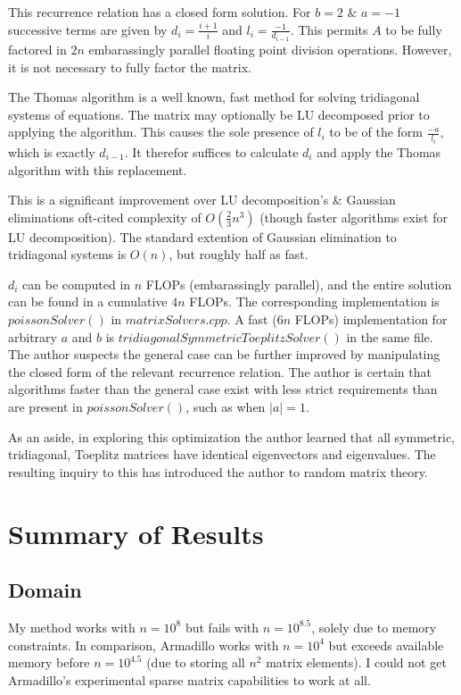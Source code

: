 \documentclass[10pt, conference, compsocconf]{IEEEtran}
\begin{document}
This recurrence relation has a closed form solution. For $b=2$ \& $a=-1$ successive terms are given by $d_i = \frac{i+1}{i}$ and $l_i = \frac{-1}{d_{i-1}}$. This permits $A$ to be fully factored in $2n$ embarassingly parallel floating point division operations. However, it is not necessary to fully factor the matrix.

The Thomas algorithm is a well known, fast method for solving tridiagonal systems of equations. The matrix may optionally be LU decomposed prior to applying the algorithm. This causes the sole presence of $l_i$ to be of the form $\frac{-a}{l_i}$, which is exactly $d_{i-1}$. It therefor suffices to calculate $d_i$ and apply the Thomas algorithm with this replacement. 

This is a significant improvement over LU decomposition's \& Gaussian eliminations oft-cited complexity of $O\left(\frac{2}{3}n^3\right)$ (though faster algorithms exist for LU decomposition). The standard extention of Gaussian elimination to tridiagonal systems is $O(n)$, but roughly half as fast.

$d_i$ can be computed in $n$ FLOPs (embarassingly parallel), and the entire solution can be found in a cumulative $4n$ FLOPs. The corresponding implementation is $poissonSolver()$ in $matrixSolvers.cpp$. A fast ($6n$ FLOPs) implementation for arbitrary $a$ and $b$ is $tridiagonalSymmetricToeplitzSolver()$ in the same file. The author suspects the general case can be further improved by manipulating the closed form of the relevant recurrence relation. The author is certain that algorithms faster than the general case exist with less strict requirements than are present in $poissonSolver()$, such as when $|a|=1$. 

As an aside, in exploring this optimization the author learned that all symmetric, tridiagonal, Toeplitz matrices have identical eigenvectors and eigenvalues. The resulting inquiry to this has introduced the author to random matrix theory.

\section{Summary of Results}
\subsection{Domain}
My method works with $n=10^{8}$ but fails with $n=10^{8.5}$, solely due to memory constraints. In comparison, Armadillo works with $n=10^4$ but exceeds available memory before $n=10^{4.5}$ (due to storing all $n^2$ matrix elements). I could not get Armadillo's experimental sparse matrix capabilities to work at all.
\end{document}
